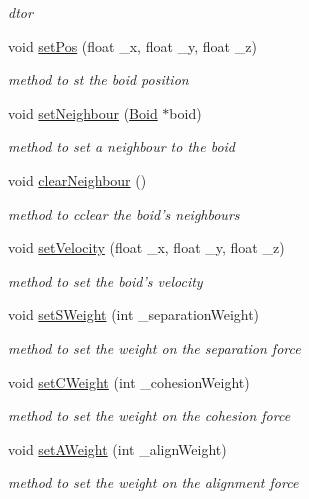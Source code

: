 \begin{DoxyCompactItemize}
\begin{DoxyCompactList}\small\item\em dtor \end{DoxyCompactList}\item 
void \hyperlink{classBoid_a38026ec733e0e7e705127e3f88f69b99}{set\-Pos} (float \-\_\-x, float \-\_\-y, float \-\_\-z)
\begin{DoxyCompactList}\small\item\em method to st the boid position \end{DoxyCompactList}\item 
void \hyperlink{classBoid_a97552481a8c6f43e203d0bc2df083830}{set\-Neighbour} (\hyperlink{classBoid}{Boid} $\ast$boid)
\begin{DoxyCompactList}\small\item\em method to set a neighbour to the boid \end{DoxyCompactList}\item 
void \hyperlink{classBoid_aeb1fd57777cec9eab3f735312c2a2599}{clear\-Neighbour} ()
\begin{DoxyCompactList}\small\item\em method to cclear the boid's neighbours \end{DoxyCompactList}\item 
void \hyperlink{classBoid_a610fd5764690285c3c81135c30162633}{set\-Velocity} (float \-\_\-x, float \-\_\-y, float \-\_\-z)
\begin{DoxyCompactList}\small\item\em method to set the boid's velocity \end{DoxyCompactList}\item 
void \hyperlink{classBoid_af24205fb4e30e0e746c3146c59252fda}{set\-S\-Weight} (int \-\_\-separation\-Weight)
\begin{DoxyCompactList}\small\item\em method to set the weight on the separation force \end{DoxyCompactList}\item 
void \hyperlink{classBoid_aa2ace7fb25c823079ebdab97dfefdf28}{set\-C\-Weight} (int \-\_\-cohesion\-Weight)
\begin{DoxyCompactList}\small\item\em method to set the weight on the cohesion force \end{DoxyCompactList}\item 
void \hyperlink{classBoid_acc3767ea7aaff905b618aab1dcb8d2e3}{set\-A\-Weight} (int \-\_\-align\-Weight)
\begin{DoxyCompactList}\small\item\em method to set the weight on the alignment force \end{DoxyCompactList}\item 

\end{DoxyCompactItemize}
